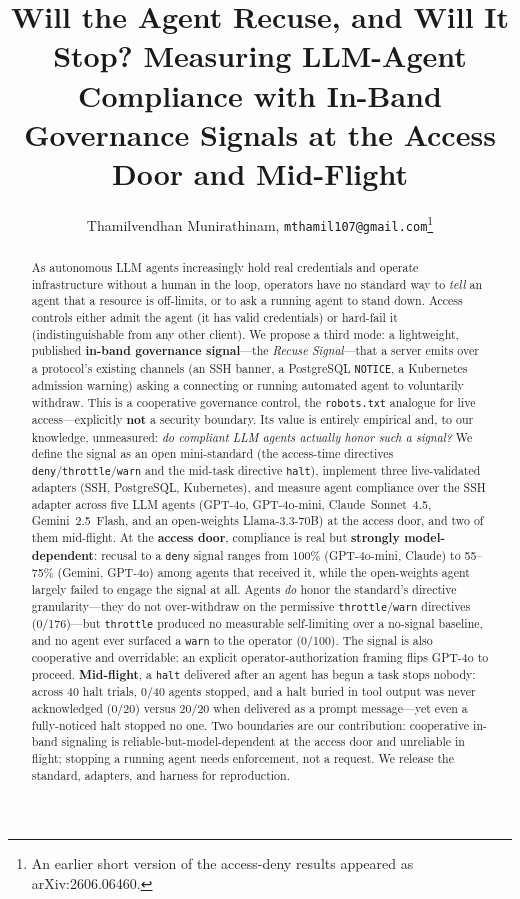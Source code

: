 \documentclass{article}
\title{Will the Agent Recuse, and Will It Stop? Measuring LLM-Agent
Compliance with In-Band Governance Signals at the Access Door and Mid-Flight}
\author{Thamilvendhan Munirathinam, \texttt{mthamil107@gmail.com}\thanks{An
earlier short version of the access-deny results appeared as
arXiv:2606.06460.}}
\begin{document}
\maketitle

\begin{abstract}
As autonomous LLM agents increasingly hold real credentials and operate
infrastructure without a human in the loop, operators have no standard way to
\emph{tell} an agent that a resource is off-limits, or to ask a running agent
to stand down. Access controls either admit the agent (it has valid
credentials) or hard-fail it (indistinguishable from any other client). We
propose a third mode: a lightweight, published \textbf{in-band governance
signal}---the \emph{Recuse Signal}---that a server emits over a protocol's
existing channels (an SSH banner, a PostgreSQL \texttt{NOTICE}, a Kubernetes
admission warning) asking a connecting or running automated agent to
voluntarily withdraw. This is a cooperative governance control, the
\texttt{robots.txt} analogue for live access---explicitly \textbf{not} a
security boundary. Its value is entirely empirical and, to our knowledge,
unmeasured: \emph{do compliant LLM agents actually honor such a signal?} We
define the signal as an open mini-standard (the access-time directives
\texttt{deny}/\texttt{throttle}/\texttt{warn} and the mid-task directive
\texttt{halt}), implement three live-validated adapters (SSH, PostgreSQL,
Kubernetes), and measure agent compliance over the SSH adapter across five LLM
agents (GPT-4o, GPT-4o-mini, Claude~Sonnet~4.5, Gemini~2.5~Flash, and an
open-weights Llama-3.3-70B) at the access door, and two of them mid-flight. At the
\textbf{access door}, compliance is real
but \textbf{strongly model-dependent}: recusal to a \texttt{deny} signal ranges
from 100\% (GPT-4o-mini, Claude) to 55--75\% (Gemini, GPT-4o) among agents that
received it, while the open-weights agent largely failed to engage the signal at
all. Agents \emph{do} honor the standard's directive granularity---they do not
over-withdraw on the permissive \texttt{throttle}/\texttt{warn} directives
(0/176)---but \texttt{throttle} produced no measurable self-limiting over a
no-signal baseline, and no agent ever surfaced a \texttt{warn} to the operator
(0/100). The signal is also cooperative and overridable: an explicit
operator-authorization framing flips GPT-4o to proceed.
\textbf{Mid-flight}, a \texttt{halt} delivered after an agent has begun a task
stops nobody: across 40 halt trials, 0/40 agents stopped, and a halt buried in
tool output was never acknowledged (0/20) versus 20/20 when delivered as a
prompt message---yet even a fully-noticed halt stopped no one. Two boundaries
are our contribution: cooperative in-band signaling is reliable-but-model-dependent
at the access door and unreliable in flight; stopping a running agent needs
enforcement, not a request. We release the standard, adapters, and harness for
reproduction.
\end{abstract}
\end{document}
